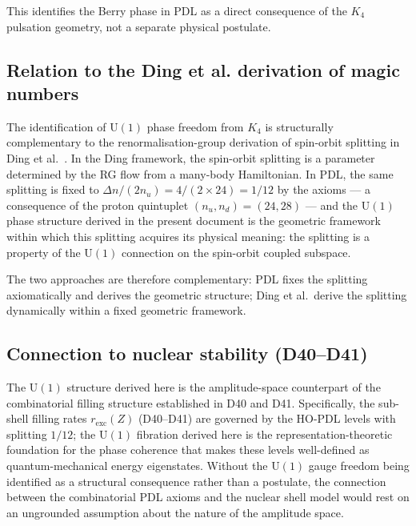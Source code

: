 \documentclass[12pt,a4paper]{article}
\begin{document}
This identifies the Berry phase in PDL as a direct consequence of the $K_4$ pulsation
geometry, not a separate physical postulate.

\subsection{Relation to the Ding et al. derivation of magic numbers}

The identification of $\mathrm{U}(1)$ phase freedom from $K_4$ is structurally
complementary to the renormalisation-group derivation of spin-orbit splitting in
Ding et al.~\cite{Ding_PRL_2026}. In the Ding framework, the spin-orbit splitting
is a parameter determined by the RG flow from a many-body Hamiltonian. In PDL,
the same splitting is fixed to $\Delta n/(2n_u) = 4/(2\times24) = 1/12$ by the
axioms — a consequence of the proton quintuplet $(n_u, n_d) = (24, 28)$ — and the
$\mathrm{U}(1)$ phase structure derived in the present document is the geometric
framework within which this splitting acquires its physical meaning: the splitting
is a property of the $\mathrm{U}(1)$ connection on the spin-orbit coupled subspace.

The two approaches are therefore complementary: PDL fixes the splitting axiomatically
and derives the geometric structure; Ding et al.\ derive the splitting dynamically
within a fixed geometric framework.

\subsection{Connection to nuclear stability (D40--D41)}

The $\mathrm{U}(1)$ structure derived here is the amplitude-space counterpart of
the combinatorial filling structure established in D40 and D41. Specifically, the
sub-shell filling rates $r_\mathrm{exc}(Z)$ (D40--D41) are governed by the
HO-PDL levels with splitting $1/12$; the $\mathrm{U}(1)$ fibration derived here
is the representation-theoretic foundation for the phase coherence that makes these
levels well-defined as quantum-mechanical energy eigenstates. Without the $\mathrm{U}(1)$
gauge freedom being identified as a structural consequence rather than a postulate,
the connection between the combinatorial PDL axioms and the nuclear shell model
would rest on an ungrounded assumption about the nature of the amplitude space. 
\end{document}
